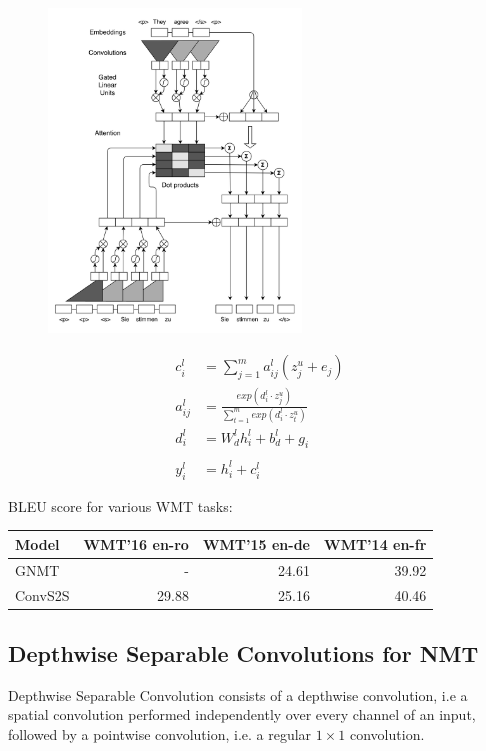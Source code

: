 \documentclass[a4paper]{article}
\begin{document}
\begin{figure}
  \center
  \includegraphics[width=0.6\textwidth]{img/CS2S}
\end{figure}


\begin{align*}
  c_i^l &= \sum_{j = 1}^{m}{a_{ij}^l(z_j^u + e_j)} \\
  a_{ij}^l &= \frac{exp(d_i^l \cdot z_j^u)}
  {\sum_{t = 1}^{m}{exp(d_i^l \cdot z_t^u)}} \\
  d_i^l &= W_d^l h_i^l + b_d^l + g_i \\
  \\
  y_i^l &= h_i^l + c_i^l
\end{align*}


BLEU score for various WMT tasks:


\begin{center}
  \begin{tabular}{lrrr}
  \hline
    Model & WMT'16 en-ro & WMT'15 en-de & WMT'14 en-fr \\
  \hline
    GNMT & - & 24.61 & 39.92 \\
    ConvS2S & 29.88 & 25.16 & 40.46 \\
  \hline
  \end{tabular}
\end{center}


\subsection{Depthwise Separable Convolutions for NMT}


Depthwise  Separable Convolution consists of  a  depthwise  convolution,  i.e  a
spatial convolution performed  independently  over  every channel  of  an input,
followed by a pointwise convolution, i.e. a regular $1 \times 1$ convolution.
\end{document}
